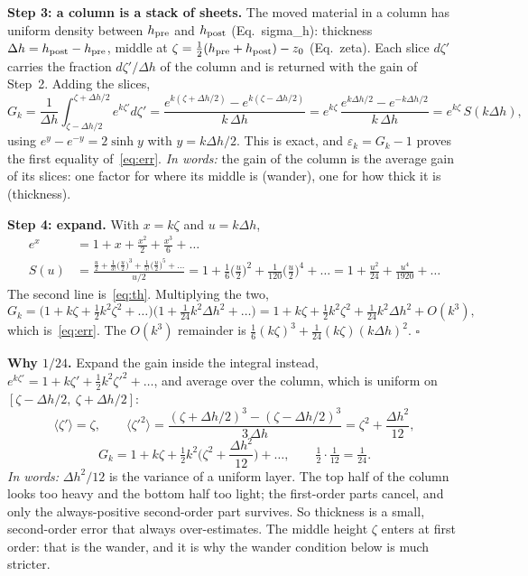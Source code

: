 \documentclass[11pt]{article}
\newcommand{\D}[1]{\textsf{#1}}   %
\newcommand{\words}[1]{\emph{In words:} #1}
\begin{document}
\textbf{Step 3: a column is a stack of sheets.} The moved material in a column
has uniform density between $h_{\rm pre}$ and $h_{\rm post}$
(Eq.~\D{sigma\_h}): thickness $\Delta h=h_{\rm post}-h_{\rm pre}$, middle at
$\zeta=\tfrac12(h_{\rm pre}+h_{\rm post})-z_0$ (Eq.~\D{zeta}). Each slice
$d\zeta'$ carries the fraction $d\zeta'/\Delta h$ of the column and is
returned with the gain of Step~2. Adding the slices,
\begin{equation}
  G_k=\frac{1}{\Delta h}\int_{\zeta-\Delta h/2}^{\zeta+\Delta h/2}e^{k\zeta'}d\zeta'
  =\frac{e^{k(\zeta+\Delta h/2)}-e^{k(\zeta-\Delta h/2)}}{k\,\Delta h}
  =e^{k\zeta}\,\frac{e^{k\Delta h/2}-e^{-k\Delta h/2}}{k\,\Delta h}
  =e^{k\zeta}\,S(k\Delta h),
  \label{eq:G}
\end{equation}
using $e^{y}-e^{-y}=2\sinh y$ with $y=k\Delta h/2$. This is exact, and
$\varepsilon_k=G_k-1$ proves the first equality of~\eqref{eq:err}.
\words{the gain of the column is the average gain of its slices: one factor
for where its middle is (wander), one for how thick it is (thickness).}

\textbf{Step 4: expand.} With $x=k\zeta$ and $u=k\Delta h$,
\begin{align}
  e^{x}&=1+x+\frac{x^2}{2}+\frac{x^3}{6}+\dots
  \label{eq:exp}\\
  S(u)&=\frac{\tfrac u2+\tfrac{1}{3!}\big(\tfrac u2\big)^3+\tfrac{1}{5!}\big(\tfrac u2\big)^5+\dots}{u/2}
  =1+\frac{1}{6}\Big(\frac u2\Big)^2+\frac{1}{120}\Big(\frac u2\Big)^4+\dots
  =1+\frac{u^2}{24}+\frac{u^4}{1920}+\dots
  \label{eq:Sexp}
\end{align}
The second line is~\eqref{eq:th}. Multiplying the two,
\begin{equation}
  G_k=\Big(1+k\zeta+\tfrac12k^2\zeta^2+\dots\Big)\Big(1+\tfrac1{24}k^2\Delta h^2+\dots\Big)
  =1+k\zeta+\tfrac12k^2\zeta^2+\tfrac1{24}k^2\Delta h^2+O(k^3),
\end{equation}
which is~\eqref{eq:err}. The $O(k^3)$ remainder is
$\tfrac16(k\zeta)^3+\tfrac1{24}(k\zeta)(k\Delta h)^2$. \hfill$\square$

\textbf{Why $1/24$.} Expand the gain inside the integral instead,
$e^{k\zeta'}=1+k\zeta'+\tfrac12k^2\zeta'^2+\dots$, and average over the
column, which is uniform on $[\zeta-\Delta h/2,\ \zeta+\Delta h/2]$:
\begin{equation}
  \langle\zeta'\rangle=\zeta,\qquad
  \langle\zeta'^2\rangle=\frac{(\zeta+\Delta h/2)^3-(\zeta-\Delta h/2)^3}{3\,\Delta h}
  =\zeta^2+\frac{\Delta h^2}{12},
\end{equation}
\begin{equation}
  G_k=1+k\zeta+\tfrac12k^2\Big(\zeta^2+\frac{\Delta h^2}{12}\Big)+\dots,
  \qquad \tfrac12\cdot\tfrac1{12}=\tfrac1{24}.
\end{equation}
\words{$\Delta h^2/12$ is the variance of a uniform layer. The top half of the
column looks too heavy and the bottom half too light; the first-order parts
cancel, and only the always-positive second-order part survives. So thickness
is a small, second-order error that always over-estimates. The middle height
$\zeta$ enters at first order: that is the wander, and it is why the wander
condition below is much stricter.}
\end{document}
